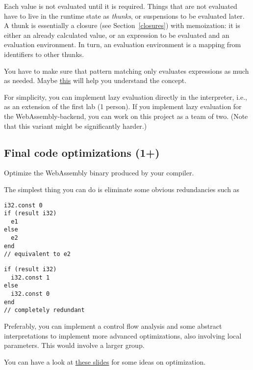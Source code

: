 Each value is not evaluated until it is required.
Things that are not evaluated have to live in the runtime state as \emph{thunks},
or suspensions to be evaluated later.
A thunk is essentially a closure (see Section~\ref{closures}) with memoization:
it is either an already calculated value,
or an expression to be evaluated and an evaluation environment.
In turn, an evaluation environment is a mapping from identifiers to other thunks.

You have to make sure that pattern matching only evaluates expressions as much as needed.
Maybe \href{https://en.wikibooks.org/wiki/Haskell/Laziness#Thunks_and_Weak_head_normal_form}{this}
will help you understand the concept.

For simplicity, you can implement lazy evaluation directly in the interpreter, i.e., as an extension of the first lab (1 person).
If you implement lazy evaluation for the WebAssembly-backend, you can work on this project as a team of two. (Note that this variant might be significantly harder.)


\subsection{Final code optimizations (1+)}
Optimize the WebAssembly binary produced by your \langname compiler.

The simplest thing you can do is eliminate some obvious redundancies such as
\begin{minipage}{0.49\textwidth}
\begin{lstlisting}
i32.const 0
if (result i32)
  e1
else
  e2
end
// equivalent to e2
\end{lstlisting}
\end{minipage}
\begin{minipage}{0.49\textwidth}
\begin{lstlisting}
if (result i32)
  i32.const 1
else
  i32.const 0
end
// completely redundant
\end{lstlisting}

\end{minipage}

Preferably, you can implement a control flow analysis and some abstract
interpretations to implement more advanced optimizations,
also involving local parameters. This would involve a larger group.

You can have a look at \href{https://cs420.epfl.ch/archive/18/s/acc18_07_optimizations.pdf}{these slides}
for some ideas on optimization.


